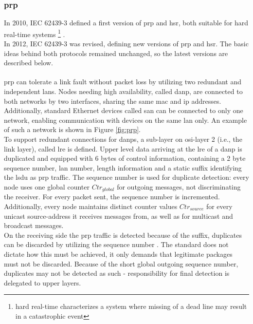\subsubsection{\gls{prp}}
In 2010, IEC 62439-3 defined a first version of {\gls{prp}} and \gls{hsr}, both suitable for hard real-time
systems \footnote{hard real-time characterizes a system where missing of a dead line may result in a catastrophic event} \cite{4416946}.
\\
In 2012, IEC 62439-3 was revised, defining new versions of \gls{prp} and \gls{hsr}. The basic ideas behind both protocols remained
unchanged, so the latest versions are described below.
\\
\\
\gls{prp} can tolerate a link fault without packet loss by utilizing two redundant and independent \glspl{lan}.
Nodes needing high availability, called \gls{danp}, are connected to both networks by two interfaces, sharing the same \gls{mac} and \gls{ip} addresses.
Additionally, standard Ethernet devices called \gls{san} can be connected to only one network, enabling communication with devices on the same \gls{lan} only.
An example of such a network is shown in Figure \ref{fig:prp}.
\\
To support redundant connections for \glspl{danp}, a sub-layer on \gls{osi}-layer 2 (i.e., the link layer), called \gls{lre} is defined. 
Upper level data arriving at the \gls{lre} of a \gls{danp} is duplicated and equipped with 6 bytes of control information, containing a 2 byte sequence number,
\gls{lan} number, length information and a static suffix identifying the \gls{lsdu} as \gls{prp} traffic. The sequence number is used for duplicate detection: 
every node uses one global counter $Ctr_{global}$ for outgoing messages, not discriminating the receiver. For every packet sent, the sequence number is incremented.
Additionally, every node maintains distinct counter values $Ctr_{source}$ for every unicast source-address it receives messages from, as well as for multicast
and broadcast messages.
\\
On the receiving side the \gls{prp} traffic is detected because of the suffix, duplicates can be discarded by utilizing the sequence number \cite{6699852}.
The standard does not dictate how this must be achieved, it only demands that legitimate packages must not be discarded. Because of the short global outgoing 
sequence number, duplicates may not be detected as such - responsibility for final detection is delegated to upper layers.
